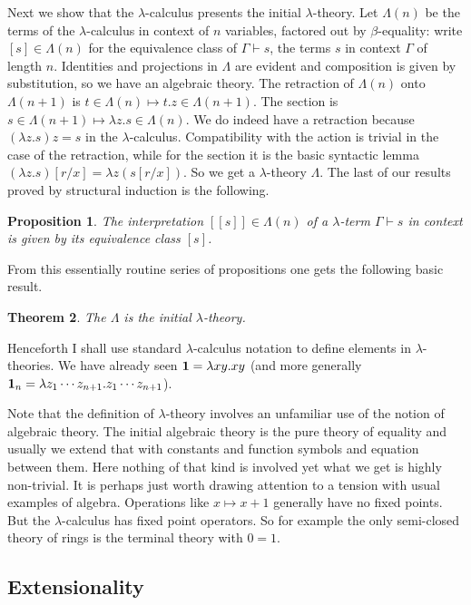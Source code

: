 \documentclass[12pt, amstex, amssymb]{article}
\newtheorem{theorem}{Theorem}[section]
\newtheorem{proposition}[theorem]{Proposition}
\newcommand{\lscott}{[\![}
\newcommand{\rscott}{]\!]}
\newcommand{\app}{{\bf 1}}
\begin{document}
Next we show that the 
$\lambda$-calculus presents the initial $\lambda$-theory. Let $\Lambda (n)$ 
be the terms of the $\lambda$-calculus in context of $n$ variables,
factored out by $\beta$-equality: write $[s] \in \Lambda(n)$ for 
the equivalence class
of $\Gamma \vdash s$, the terms $s$ in context $\Gamma$ of length $n$.
Identities and projections in $\Lambda$ are evident and composition is given
by substitution, so we have an algebraic 
theory. The retraction of $\Lambda(n)$ onto
$\Lambda (n+1)$ is $t \in \Lambda (n) \mapsto t.z \in \Lambda (n+1)$.
The section
is $s \in \Lambda (n+ 1) \mapsto \lambda z . s \in \Lambda (n)$.
We do indeed have a retraction because $(\lambda z.s)z = s$ in the
$\lambda$-calculus. Compatibility with the action is trivial
in the case of the retraction, while for the section it is the
basic syntactic lemma $(\lambda z.s)[r/x] = \lambda z (s[r/x])$.
So we get a $\lambda$-theory $\Lambda$. 
The last of our
results proved by structural induction is the following.
\begin{proposition} The interpretation $\lscott s \rscott \in \Lambda(n)$
of a $\lambda$-term $\Gamma \vdash s$ in context is given by its
equivalence class $[s]$.
\end{proposition}
From this essentially routine series of propositions
one gets the following basic result.
\begin{theorem}
The $\Lambda$ is the initial
$\lambda$-theory. 
\end{theorem}
Henceforth I shall use standard $\lambda$-calculus notation to define
elements
in $\lambda$-theories. We have already seen $\app = \lambda xy. xy$ (and
more generally $\app_n = \lambda z_1 \cdots z_{n+1}.z_1 \cdots z_{n+1}$).

Note that the definition of $\lambda$-theory involves an unfamiliar 
use of the notion of
algebraic theory. The initial algebraic 
theory is the pure 
theory of equality
and usually we extend that with constants and function symbols and equation
between them. Here nothing of that kind is involved yet what we get
is highly non-trivial. It is perhaps just worth drawing attention to a tension
with usual examples of algebra. Operations
like $x \mapsto x+1$ generally have no fixed points. But the $\lambda$-calculus
has fixed point operators. So for example the only semi-closed theory
of rings is the terminal theory with $0=1$.

\subsection{Extensionality}
\end{document}
